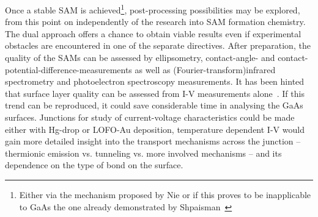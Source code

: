 \documentclass[a4paper]{article}
\begin{document}
Once a stable SAM is achieved\footnote{Either via the mechanism proposed by Nie or if this proves to be inapplicable to GaAs the one already demonstrated by Shpaisman~\cite{Shpaisman1}}, post-processing possibilities may be explored, from this point on independently of the research into SAM formation chemistry. The dual approach offers a chance to obtain viable results even if experimental obstacles are encountered in one of the separate directives.
After preparation, the quality of the SAMs can be assessed by ellipsometry, contact-angle- and contact-potential-difference-measurements as well as (Fourier-transform)infrared spectrometry and photoelectron spectroscopy measurements. It has been hinted that surface layer quality can be assessed from I-V measurements alone~\cite{Shpaisman1}. If this trend can be reproduced, it could save considerable time in analysing the GaAs surfaces.
Junctions for study of current-voltage characteristics could be made either with Hg-drop or LOFO-Au deposition, temperature dependent I-V would gain more detailed insight into the transport mechanisms across the junction -- thermionic emission vs. tunneling vs. more involved mechanisms -- and its dependence on the type of bond on the surface.
\end{document}
